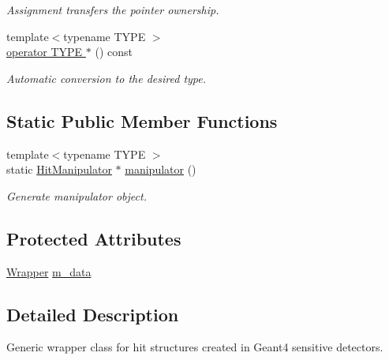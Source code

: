 \begin{DoxyCompactItemize}
\begin{DoxyCompactList}\small\item\em Assignment transfers the pointer ownership. \end{DoxyCompactList}\item 
{\footnotesize template$<$typename T\+Y\+PE $>$ }\\\hyperlink{class_d_d4hep_1_1_simulation_1_1_geant4_hit_wrapper_ac54d2631aa0e3a4becd8b071f8cf2dbd}{operator T\+Y\+P\+E $\ast$} () const
\begin{DoxyCompactList}\small\item\em Automatic conversion to the desired type. \end{DoxyCompactList}\end{DoxyCompactItemize}
\subsection*{Static Public Member Functions}
\begin{DoxyCompactItemize}
\item 
{\footnotesize template$<$typename T\+Y\+PE $>$ }\\static \hyperlink{class_d_d4hep_1_1_simulation_1_1_geant4_hit_wrapper_1_1_hit_manipulator}{Hit\+Manipulator} $\ast$ \hyperlink{class_d_d4hep_1_1_simulation_1_1_geant4_hit_wrapper_a332101c195da46df30565b5285904d27}{manipulator} ()
\begin{DoxyCompactList}\small\item\em Generate manipulator object. \end{DoxyCompactList}\end{DoxyCompactItemize}
\subsection*{Protected Attributes}
\begin{DoxyCompactItemize}
\item 
\hyperlink{class_d_d4hep_1_1_simulation_1_1_geant4_hit_wrapper_a4779e35eba7d553e0f2d497c49a42ec6}{Wrapper} \hyperlink{class_d_d4hep_1_1_simulation_1_1_geant4_hit_wrapper_a2344f57f3d02ecd148c2b4893dffe660}{m\+\_\+data}
\end{DoxyCompactItemize}


\subsection{Detailed Description}
Generic wrapper class for hit structures created in Geant4 sensitive detectors. 

